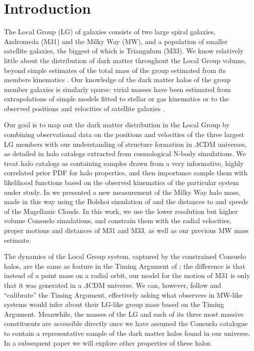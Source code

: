 \documentclass{emulateapj}
\newcommand{\bolshoi}{{\sc Bolshoi }}
\newcommand{\consuelo}{{\sc Consuelo }}
\begin{document}


\section{Introduction}
\label{sec:intro}

The Local Group (LG) of galaxies consists of two large spiral galaxies,
Andromeda (M31) and the Milky Way (MW), and a population of smaller
satellite galaxies, the biggest of which is Triangulum (M33). We know
relatively little about the distribution of dark matter throughout the Local
Group volume, beyond simple estimates of the total mass of the group
estimated from its members kinematics \citep[e.g.\ ][hereafter VG08]{vdM+G08}.
Our knowledge of the dark matter halos of the group member galaxies is
similarly sparse: virial masses have been estimated from extrapolations of
simple models fitted to stellar or gas kinematics \citep[e.g.\
][]{Xue+08,M31rotcurve} or to the observed positions and 
velocities of satellite galaxies \citep[e.g.\ ][]{EvansEtc}. 

Our goal is to map out the dark matter distribution in the Local Group
by combining observational data on the  positions and velocities of the
three largest LG members with our understanding of structure formation
in $\Lambda$CDM universes, as detailed in halo catalogs extracted from
cosmological N-body simulations. We treat halo catalogs as containing
samples drawn from a very informative, highly correlated prior PDF for
halo properties, and then  importance sample them with likelihood
functions based on the observed kinematics of the particular system
under study. In \citet[][hereafter B11]{Bus++11} we presented a new
measurement of the Milky Way halo mass, made in this way using the
\bolshoi simulation of \citet{Bolshoi} and the distances to and speeds
of the Magellanic Clouds. In this work, we use the lower resolution but
higher volume \consuelo simulations, and constrain them with the radial
velocities, proper motions and distances of M31 and M33, as well as our
previous MW mass estimate.

The dynamics of the Local Group system, captured by the constrained
\consuelo halos, are the same as feature in the Timing Argument of
\citet{K+W59}; the difference is that instead of a point mass on a
radial orbit, our model for the motion of M31 is only that it was
generated in a $\Lambda$CDM universe. We can, however, follow
\citet{L+W08} and ``calibrate'' the Timing Argument, effectively asking
what observers in MW-like systems would infer about their LG-like group
mass based on the Timing Argument.  Meanwhile, the masses of the LG and
each of its three most massive constituents are accessible directly once
we have assumed the \consuelo catalogue to contain a representative
sample of the dark matter halos found in our universe. In a subsequent
paper we will explore other properties of these halos.
\end{document}
